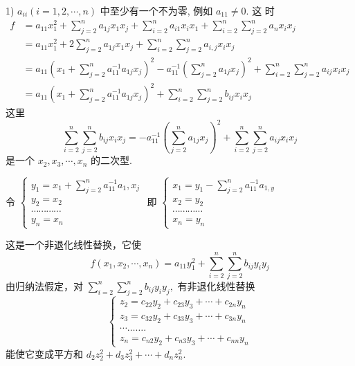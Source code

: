 \documentclass[13pt]{beamer}
\begin{document}
\begin{frame}
1) $a_{i i}(i=1,2, \cdots, n)$ 中至少有一个不为零, 例如 $a_{11} \neq 0 .$ 这
时
\begin{align*}
f &=a_{11} x_{1}^{2}+\sum_{j=2}^{n} a_{1j} x_{1} x_{j}+\sum_{i=2}^{n} a_{i 1} x_{i} x_{1} +\sum_{i=2}^{n} \sum_{j=2}^{n} a_{n} x_{i} x_{j} \\
&=a_{11} x_{1}^{2}+2 \sum_{j=2}^{n} a_{1j} x_{1} x_{j}+\sum_{i=2}^{n} \sum_{j=2}^{n} a_{i, j} x_{i} x_j \\
&=a_{11}\left(x_{1}+\sum_{j=2}^{n} a_{11}^{-1} a_{1 j} x_{j}\right)^{2}-a_{11}^{-1}\left(\sum_{j=2}^{n} a_{1 j} x_{j}\right)^{2}  +\sum_{i=2}^{n} \sum_{j=2}^{n} a_{i j} x_{i} x_{j} \\
& =a_{11}\left(x_{1}+\sum_{j=2}^{n} a_{11}^{-1} a_{1j }x_{j}\right)^{2}+\sum_{i=2}^{n} \sum_{j=2}^{n} b_{i j} x_{i} x_{j}
\end{align*}
这里
\[
\sum_{i=2}^{n} \sum_{j=2}^{n} b_{i j} x_{i} x_{j}
=-a_{11}^{-1}\left(\sum_{j=2}^{n} a_{1 j} x_j \right)^{2}+\sum_{i=2}^{n} \sum_{j=2}^{n} a_{i j} x_{i} x_j
\]
是一个 $x_{2}, x_{3}, \cdots, x_{n}$ 的二次型.
\end{frame}

\begin{frame}
\begin{center}
令
$
\left\{\begin{array}{l}
y_{1}=x_{1}+\sum_{j=2}^{n} a_{11}^{-1} a_{1}, x_{j} \\
y_{2}=x_{2} \\
\cdots \cdots \cdots \cdots \\
y_{n}=x_{n}
\end{array}\right.
$
即
$
\left\{\begin{array}{l}
x_{1}=y_{1}-\sum_{j=2}^{n} a_{11}^{-1} a_{1, y} \\
x_{2}=y_{2} \\
\cdots \cdots \cdots \cdots \\
x_{n}=y_{n}
\end{array}\right.
$
\end{center}

这是一个非退化线性替换，它使
\[
f\left(x_{1}, x_{2}, \cdots, x_{n}\right)=a_{11} y_{1}^{2}+\sum_{i=2}^{n} \sum_{j=2}^{n} b_{ij}  y_i y_{j}
\]
由归纳法假定，对 $\sum_{i=2}^{n} \sum_{j=2}^{n} b_{i j} y_{i} y_j,$ 有非退化线性替换
\[
\left\{\begin{array}{l}
z_{2}=c_{22} y_{2}+c_{23} y_{3}+\cdots+c_{2 n} y_{n} \\
z_{3}=c_{32} y_{2}+c_{33} y_{3}+\cdots+c_{3 n} y_{n} \\
\cdots \ldots \ldots . \\
z_{n}=c_{n 2} y_{2}+c_{n 3} y_{3}+\cdots+c_{n n} y_{n}
\end{array}\right.
\]
能使它变成平方和
$
d_{2} z_{2}^{2}+d_{3} z_{3}^{2}+\cdots+d_{n} z_{n}^{2}.
$
\end{frame}
\end{document}
